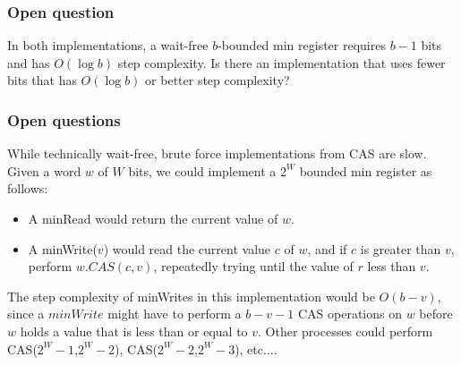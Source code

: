\documentclass{beamer}
\begin{document}
\begin{frame}
	\frametitle{Open question}
		In both implementations, a wait-free $b$-bounded min register requires $b-1$ bits and has $O(\log b)$ step complexity.
		Is there an implementation that uses fewer bits that has $O(\log b)$ or better step complexity?
\end{frame}
\begin{frame}
	\frametitle{Open questions}
	While technically wait-free, brute force implementations from CAS are slow. Given a word $w$ of $W$ bits, 
	we could implement a $2^W$ bounded min register as follows:
	\begin{itemize}
		\item A minRead would return the current value of $w$.
		\item A minWrite($v$) would read the current value $c$ of $w$, and if $c$ is greater than $v$, 
		perform $w.CAS(c,v)$, repeatedly trying until the value of $r$ less than $v$.
	\end{itemize}
	The step complexity of minWrites in this implementation would be $O(b-v)$, since a $minWrite$ might have to perform a $b-v-1$ CAS operations on $w$
	before $w$ holds a value that is less than or equal to $v$. Other processes could perform CAS($2^W - 1$,$2^W - 2$), CAS($2^W - 2$,$2^W - 3$), etc....
\end{frame}
\end{document}
